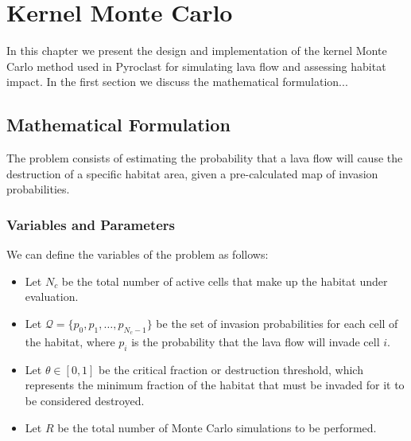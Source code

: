 \chapter{Kernel Monte Carlo}\label{chap:kernel_monte_carlo}

In this chapter we present the design and implementation of the kernel Monte Carlo method used in Pyroclast for simulating lava flow and assessing habitat impact. In the first section we discuss the mathematical formulation...

\section{Mathematical Formulation}\label{sec:math_formulation}
The problem consists of estimating the probability that a lava flow will cause the destruction of a specific habitat area, given a pre-calculated map of invasion probabilities. 

\subsection{Variables and Parameters}\label{subsec:variables_parameters}
We can define the variables of the problem as follows:
\begin{itemize}
    \item Let $N_c$ be the total number of active cells that make up the habitat under evaluation.
    \item Let $\mathcal{Q} = \{p_0, p_1, \dots, p_{N_c-1}\}$ be the set of invasion probabilities for each cell of the habitat, where $p_i$ is the probability that the lava flow will invade cell $i$.
    \item Let $\theta \in [0, 1]$ be the critical fraction or destruction threshold, which represents the minimum fraction of the habitat that must be invaded for it to be considered destroyed.
    \item Let $R$ be the total number of Monte Carlo simulations to be performed.
\end{itemize}

